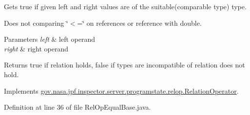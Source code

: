 Gets true if given left and right values are of the suitable(comparable type) type. 

Does not comparing \char`\"{}$<$=\char`\"{} on references or reference with double.


\begin{DoxyParams}{Parameters}
{\em left} & left operand \\
\hline
{\em right} & right operand \\
\hline
\end{DoxyParams}
\begin{DoxyReturn}{Returns}
true if relation holds, false if types are incompatible of relation does not hold. 
\end{DoxyReturn}


Implements \hyperlink{interfacegov_1_1nasa_1_1jpf_1_1inspector_1_1server_1_1programstate_1_1relop_1_1_relation_operator_ad35e4918d8de2de096c7d8035352a3ec}{gov.\+nasa.\+jpf.\+inspector.\+server.\+programstate.\+relop.\+Relation\+Operator}.



Definition at line 36 of file Rel\+Op\+Equal\+Base.\+java.


